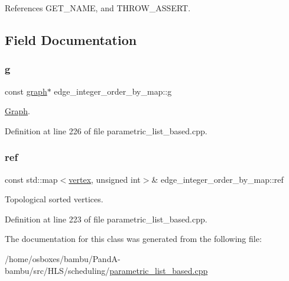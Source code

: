 References G\+E\+T\+\_\+\+N\+A\+ME, and T\+H\+R\+O\+W\+\_\+\+A\+S\+S\+E\+RT.



\subsection{Field Documentation}
\mbox{\label{classedge__integer__order__by__map_a17b475d7942cce1cd0a41a104f727ac7}} 
\subsubsection{\texorpdfstring{g}{g}}
{\footnotesize\ttfamily const \hyperlink{structgraph}{graph}$\ast$ edge\+\_\+integer\+\_\+order\+\_\+by\+\_\+map\+::g\hspace{0.3cm}{\ttfamily [private]}}



\hyperlink{structGraph}{Graph}. 



Definition at line 226 of file parametric\+\_\+list\+\_\+based.\+cpp.

\mbox{\label{classedge__integer__order__by__map_a5438a43273d4a572f91cbe16083976b8}} 
\subsubsection{\texorpdfstring{ref}{ref}}
{\footnotesize\ttfamily const std\+::map$<$\hyperlink{graph_8hpp_abefdcf0544e601805af44eca032cca14}{vertex}, unsigned int$>$\& edge\+\_\+integer\+\_\+order\+\_\+by\+\_\+map\+::ref\hspace{0.3cm}{\ttfamily [private]}}



Topological sorted vertices. 



Definition at line 223 of file parametric\+\_\+list\+\_\+based.\+cpp.



The documentation for this class was generated from the following file\+:\begin{DoxyCompactItemize}
\item 
/home/osboxes/bambu/\+Pand\+A-\/bambu/src/\+H\+L\+S/scheduling/\hyperlink{parametric__list__based_8cpp}{parametric\+\_\+list\+\_\+based.\+cpp}\end{DoxyCompactItemize}
